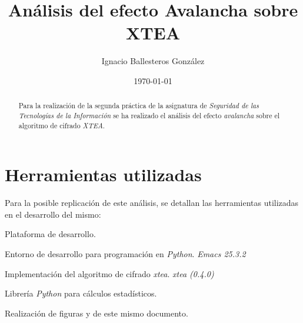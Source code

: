 \documentclass[11pt,a4paper]{article}
\title{Análisis del efecto Avalancha sobre XTEA}
\author{Ignacio Ballesteros González}
\date{\today}
\begin{document}
\maketitle
\tableofcontents
\begin{abstract}
  Para la realización de la segunda práctica de la asignatura de
  \emph{Seguridad de las Tecnologías de la Información} se ha
  realizado el análisis del efecto \emph{avalancha} sobre el algoritmo de
  cifrado \emph{XTEA}.
\end{abstract}

\section{Herramientas utilizadas}

Para la posible replicación de este análisis, se detallan las
herramientas utilizadas en el desarrollo del mismo:

\begin{description}[align=left] %
\item [Python 2 y 3] Plataforma de desarrollo.
\item [Emacs] Entorno de desarrollo para programación en \emph{Python}. \emph{Emacs 25.3.2}
\item [xtea] Implementación del algoritmo de cifrado \emph{xtea}. \emph{xtea (0.4.0)}
\item [as] Librería \emph{Python} para cálculos estadísticos.
\item [\LaTeX] Realización de figuras y de este mismo documento.
\end{description}
\end{document}
